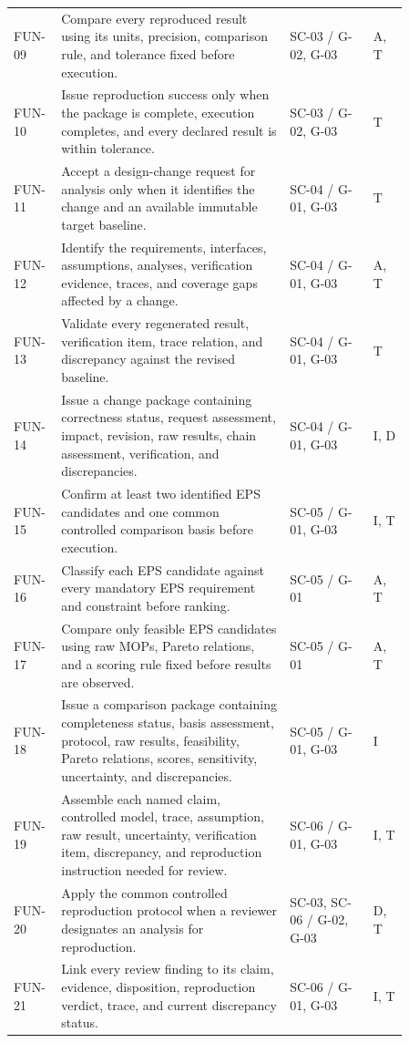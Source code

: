 \documentclass[11pt,a4paper]{article}
\begin{document}
\begin{longtable}{>{\raggedright\arraybackslash}p{0.07\linewidth} >{\raggedright\arraybackslash}p{0.52\linewidth} >{\raggedright\arraybackslash}p{0.19\linewidth} >{\raggedright\arraybackslash}p{0.08\linewidth}}
    FUN-09 & Compare every reproduced result using its units, precision, comparison rule, and tolerance fixed before execution. & SC-03 / G-02, G-03 & A, T \\
    FUN-10 & Issue reproduction success only when the package is complete, execution completes, and every declared result is within tolerance. & SC-03 / G-02, G-03 & T \\
    FUN-11 & Accept a design-change request for analysis only when it identifies the change and an available immutable target baseline. & SC-04 / G-01, G-03 & T \\
    FUN-12 & Identify the requirements, interfaces, assumptions, analyses, verification evidence, traces, and coverage gaps affected by a change. & SC-04 / G-01, G-03 & A, T \\
    FUN-13 & Validate every regenerated result, verification item, trace relation, and discrepancy against the revised baseline. & SC-04 / G-01, G-03 & T \\
    FUN-14 & Issue a change package containing correctness status, request assessment, impact, revision, raw results, chain assessment, verification, and discrepancies. & SC-04 / G-01, G-03 & I, D \\
    FUN-15 & Confirm at least two identified EPS candidates and one common controlled comparison basis before execution. & SC-05 / G-01, G-03 & I, T \\
    FUN-16 & Classify each EPS candidate against every mandatory EPS requirement and constraint before ranking. & SC-05 / G-01 & A, T \\
    FUN-17 & Compare only feasible EPS candidates using raw MOPs, Pareto relations, and a scoring rule fixed before results are observed. & SC-05 / G-01 & A, T \\
    FUN-18 & Issue a comparison package containing completeness status, basis assessment, protocol, raw results, feasibility, Pareto relations, scores, sensitivity, uncertainty, and discrepancies. & SC-05 / G-01, G-03 & I \\
    FUN-19 & Assemble each named claim, controlled model, trace, assumption, raw result, uncertainty, verification item, discrepancy, and reproduction instruction needed for review. & SC-06 / G-01, G-03 & I, T \\
    FUN-20 & Apply the common controlled reproduction protocol when a reviewer designates an analysis for reproduction. & SC-03, SC-06 / G-02, G-03 & D, T \\
    FUN-21 & Link every review finding to its claim, evidence, disposition, reproduction verdict, trace, and current discrepancy status. & SC-06 / G-01, G-03 & I, T \\

\end{longtable}
\end{document}

